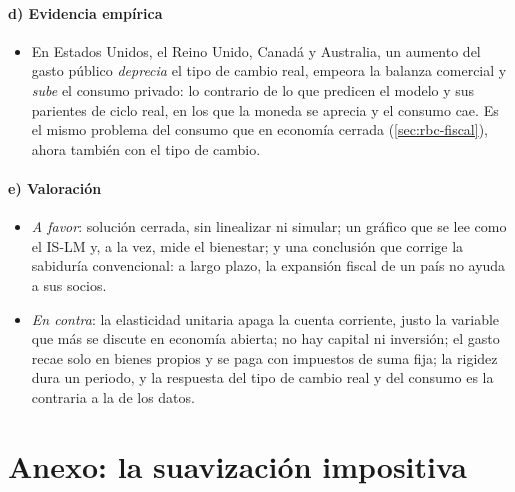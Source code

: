 \documentclass[11pt]{article}
\begin{document}
\paragraph{d) Evidencia empírica}

\begin{itemize}
\item En Estados Unidos, el Reino Unido, Canadá y Australia, un aumento del gasto público \emph{deprecia} el tipo de cambio real, empeora la balanza comercial y \emph{sube} el consumo privado\nocite{MonacelliPerotti2010Fiscal}: lo contrario de lo que predicen el modelo y sus parientes de ciclo real, en los que la moneda se aprecia y el consumo cae. Es el mismo problema del consumo que en economía cerrada (\ref{sec:rbc-fiscal}), ahora también con el tipo de cambio.
\end{itemize}

\paragraph{e) Valoración}

\begin{itemize}
\item \emph{A favor}: solución cerrada, sin linealizar ni simular; un gráfico que se lee como el IS-LM y, a la vez, mide el bienestar; y una conclusión que corrige la sabiduría convencional: a largo plazo, la expansión fiscal de un país no ayuda a sus socios.
\item \emph{En contra}: la elasticidad unitaria apaga la cuenta corriente, justo la variable que más se discute en economía abierta; no hay capital ni inversión; el gasto recae solo en bienes propios y se paga con impuestos de suma fija; la rigidez dura un periodo, y la respuesta del tipo de cambio real y del consumo es la contraria a la de los datos.
\end{itemize}

\section{Anexo: la suavización impositiva}\label{anexo:suavizacion}
\end{document}

